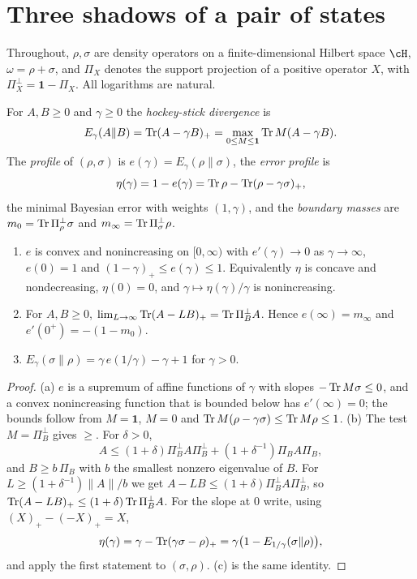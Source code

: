\section{Three shadows of a pair of states}\label{shA:sec:shadows}

Throughout, $\rho,\sigma$ are density operators on a finite-dimensional Hilbert space $\cH$, $\omega=\rho+\sigma$, and $\Pi_X$ denotes the support projection of a positive operator $X$, with $\Pi_X^\perp=\mathbf 1-\Pi_X$. All logarithms are natural.

\begin{definition}\label{shA:def:profile}
For $A,B\ge0$ and $\gamma\ge0$ the \emph{hockey-stick divergence} is
\[
E_\gamma(A\|B)=\operatorname{Tr}(A-\gamma B)_+=\max_{0\le M\le\mathbf 1}\operatorname{Tr} M(A-\gamma B).
\]
The \emph{profile} of $(\rho,\sigma)$ is $e(\gamma)=E_\gamma(\rho\|\sigma)$, the \emph{error profile} is
\[
\eta(\gamma)=1-e(\gamma)=\operatorname{Tr}\rho-\operatorname{Tr}(\rho-\gamma\sigma)_+,
\]
the minimal Bayesian error with weights $(1,\gamma)$, and the \emph{boundary masses} are $m_0=\operatorname{Tr}\Pi_\rho^\perp\sigma$ and $m_\infty=\operatorname{Tr}\Pi_\sigma^\perp\rho$.
\end{definition}

\begin{lemma}\label{shA:lem:profile}
\begin{enumerate}[label=(\alph*)]
\item $e$ is convex and nonincreasing on $[0,\infty)$ with $e'(\gamma)\to0$ as $\gamma\to\infty$, $e(0)=1$ and $(1-\gamma)_+\le e(\gamma)\le1$. Equivalently $\eta$ is concave and nondecreasing, $\eta(0)=0$, and $\gamma\mapsto\eta(\gamma)/\gamma$ is nonincreasing.
\item For $A,B\ge0$, $\lim_{L\to\infty}\operatorname{Tr}(A-LB)_+=\operatorname{Tr}\Pi_B^\perp A$. Hence $e(\infty)=m_\infty$ and $e'(0^+)=-(1-m_0)$.
\item $E_\gamma(\sigma\|\rho)=\gamma\,e(1/\gamma)-\gamma+1$ for $\gamma>0$.
\end{enumerate}
\end{lemma}

\begin{proof}
(a) $e$ is a supremum of affine functions of $\gamma$ with slopes $-\operatorname{Tr} M\sigma\le0$, and a convex nonincreasing function that is bounded below has $e'(\infty)=0$; the bounds follow from $M=\mathbf 1$, $M=0$ and $\operatorname{Tr} M(\rho-\gamma\sigma)\le\operatorname{Tr} M\rho\le1$. (b) The test $M=\Pi_B^\perp$ gives $\ge$. For $\delta>0$,
\[
A\le(1+\delta)\Pi_B^\perp A\Pi_B^\perp+(1+\delta^{-1})\Pi_BA\Pi_B,
\]
and $B\ge b\,\Pi_B$ with $b$ the smallest nonzero eigenvalue of $B$. For $L\ge(1+\delta^{-1})\|A\|/b$ we get $A-LB\le(1+\delta)\Pi_B^\perp A\Pi_B^\perp$, so $\operatorname{Tr}(A-LB)_+\le(1+\delta)\operatorname{Tr}\Pi_B^\perp A$. For the slope at $0$ write, using $(X)_+-(-X)_+=X$,
\[
\eta(\gamma)=\gamma-\operatorname{Tr}(\gamma\sigma-\rho)_+=\gamma\big(1-E_{1/\gamma}(\sigma\|\rho)\big),
\]
and apply the first statement to $(\sigma,\rho)$. (c) is the same identity.
\end{proof}

